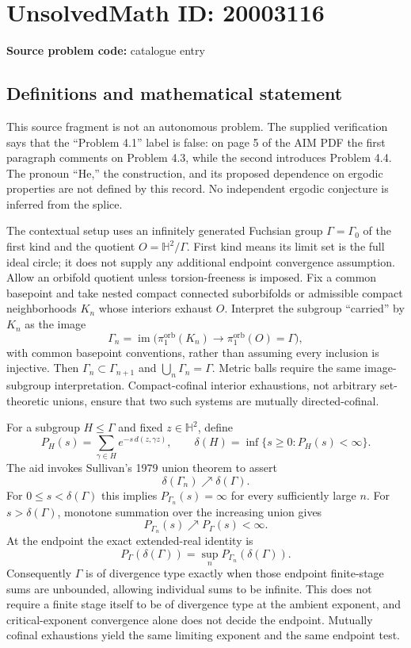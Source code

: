 \documentclass[11pt]{article}
\begin{document}
\section*{UnsolvedMath ID: 20003116}
\textbf{Source problem code:} catalogue entry
\subsection{Definitions and mathematical statement}
This source fragment is not an autonomous problem. The supplied verification says that the ``Problem 4.1'' label is false: on page 5 of the AIM PDF the first paragraph comments on Problem 4.3, while the second introduces Problem 4.4. The pronoun ``He,'' the construction, and its proposed dependence on ergodic properties are not defined by this record. No independent ergodic conjecture is inferred from the splice.

The contextual setup uses an infinitely generated Fuchsian group $\Gamma=\Gamma_0$ of the first kind and the quotient $O=\mathbb H^2/\Gamma$. First kind means its limit set is the full ideal circle; it does not supply any additional endpoint convergence assumption. Allow an orbifold quotient unless torsion-freeness is imposed. Fix a common basepoint and take nested compact connected suborbifolds or admissible compact neighborhoods $K_n$ whose interiors exhaust $O$. Interpret the subgroup ``carried'' by $K_n$ as the image
\[
 \Gamma_n=\operatorname{im}\bigl(\pi_1^{\mathrm{orb}}(K_n)
                         \to\pi_1^{\mathrm{orb}}(O)=\Gamma\bigr),
\]
with common basepoint conventions, rather than assuming every inclusion is injective. Then $\Gamma_n\subset\Gamma_{n+1}$ and $\bigcup_n\Gamma_n=\Gamma$. Metric balls require the same image-subgroup interpretation. Compact-cofinal interior exhaustions, not arbitrary set-theoretic unions, ensure that two such systems are mutually directed-cofinal.

For a subgroup $H\leq\Gamma$ and fixed $z\in\mathbb H^2$, define
\[
 P_H(s)=\sum_{\gamma\in H}e^{-s\,d(z,\gamma z)},\qquad
 \delta(H)=\inf\{s\geq0:P_H(s)<\infty\}.
\]
The aid invokes Sullivan's 1979 union theorem to assert
\[
 \delta(\Gamma_n)\nearrow\delta(\Gamma).
\]
For $0\leq s<\delta(\Gamma)$ this implies $P_{\Gamma_n}(s)=\infty$ for every sufficiently large $n$. For $s>\delta(\Gamma)$, monotone summation over the increasing union gives
\[
 P_{\Gamma_n}(s)\nearrow P_\Gamma(s)<\infty.
\]
At the endpoint the exact extended-real identity is
\[
 P_\Gamma(\delta(\Gamma))
   =\sup_n P_{\Gamma_n}(\delta(\Gamma)).
\]
Consequently $\Gamma$ is of divergence type exactly when those endpoint finite-stage sums are unbounded, allowing individual sums to be infinite. This does not require a finite stage itself to be of divergence type at the ambient exponent, and critical-exponent convergence alone does not decide the endpoint. Mutually cofinal exhaustions yield the same limiting exponent and the same endpoint test.
\end{document}
